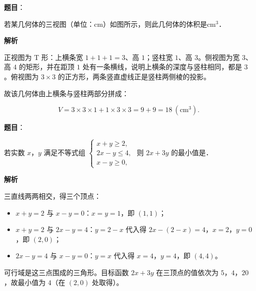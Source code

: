 \begin{answer}

\textbf{题目}：

若某几何体的三视图（单位：cm）如图所示，则此几何体的体积是\gkblank{}$\mathrm{cm^3}$．
\nopagebreak[4]
\begin{center}\end{center}
\nopagebreak[4]
\textbf{解析}

正视图为 T 形：上横条宽 $1+1+1=3$、高 $1$；竖柱宽 $1$、高 $3$。侧视图为宽 $3$、高 $4$ 的矩形，并在距顶 $1$ 处有一条横线，说明上横条的深度与竖柱相同，都是 $3$。俯视图为 $3\times3$ 的正方形，两条竖直虚线正是竖柱两侧棱的投影。

故该几何体由上横条与竖柱两部分拼成：

\nopagebreak[4]
\[V=3\times3\times1+1\times3\times3=9+9=18\ (\mathrm{cm^3}).\]


\end{answer}
\begin{answer}

\textbf{题目}：

若实数 $x$，$y$ 满足不等式组 $\begin{cases}x+y\geqslant2,\\2x-y\leqslant4,\\x-y\geqslant0,\end{cases}$ 则 $2x+3y$ 的最小值是\gkblank{}．

\textbf{解析}

三直线两两相交，得三个顶点：

\begin{itemize}
\item $x+y=2$ 与 $x-y=0$：$x=y=1$，即 $(1,1)$；
\item $x+y=2$ 与 $2x-y=4$：$y=2-x$ 代入得 $2x-(2-x)=4$，$x=2$，$y=0$，即 $(2,0)$；
\item $2x-y=4$ 与 $x-y=0$：$y=x$ 代入得 $x=4$，$y=4$，即 $(4,4)$。
\end{itemize}

可行域是这三点围成的三角形。目标函数 $2x+3y$ 在三顶点的值依次为 $5$，$4$，$20$，故最小值为 $4$（在 $(2,0)$ 处取得）。


\end{answer}
